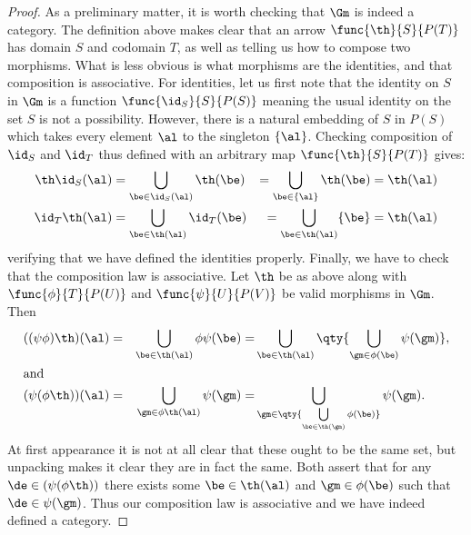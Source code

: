 \documentclass[../../main]{subfiles}
\begin{document}
\begin{proof}
	As a preliminary matter, it is worth checking that \(\Gm\) is indeed a
	category. The definition above makes clear that an arrow
	\(\func{\th}{S}{P(T)}\) has domain \(S\) and codomain \(T\), as well as
	telling us how to compose two morphisms. What is less obvious is what
	morphisms are the identities, and that composition is associative. For
	identities, let us first note that the identity on \(S\) in \(\Gm\) is a
	function \(\func{\id_S}{S}{P(S)}\) meaning the usual identity on the set
	\(S\) is not a possibility. However, there is a natural embedding of \(S\)
	in \(P(S)\) which takes every element \(\al\) to the singleton \(\{\al\}\).
	Checking composition of \(\id_S\) and \(\id_T\) thus defined with an
	arbitrary map \(\func{\th}{S}{P(T)}\) gives:
	\begin{alignat*}{4}
		\th\id_S(\al)&=
		\bigcup_{\be\in\id_S(\al)}\th(\be)&=
		\bigcup_{\be\in\{\al\}}\th(\be)&=
		\th(\al) \\
		\id_T\th(\al)&=
		\bigcup_{\be\in\th(\al)}\id_T(\be)&=
		\bigcup_{\be\in\th(\al)}\{\be\}&=
		\th(\al)
	\end{alignat*} verifying that we have defined the identities properly.
	Finally, we have to check that the composition law is associative. Let
	\(\th\) be as above along with \(\func{\phi}{T}{P(U)}\) and
	\(\func{\psi}{U}{P(V)}\) be valid morphisms in \(\Gm\). Then
	\begin{alignat*}{3}
		((\psi\phi)\th)(\al)=&&
		\bigcup_{\be\in\th(\al)}\phi\psi(\be)=&
		\bigcup_{\be\in\th(\al)}\qty{\bigcup_{\gm\in\phi(\be)}\psi(\gm)},\\
		\intertext{and}
		(\psi(\phi\th))(\al)=&&
		\bigcup_{\gm\in\phi\th(\al)}\psi(\gm)=&
		\bigcup_{\gm\in\qty{\bigcup\limits_{\be\in\th(\gm)}\phi(\be)}}\psi(\gm).
	\end{alignat*}
	At first appearance it is not at all clear that these ought to be the same
	set, but unpacking makes it clear they are in fact the same. Both assert
	that for any \(\de\in(\psi(\phi\th))\) there exists some \(\be\in\th(\al)\)
	and \(\gm\in\phi(\be)\) such that \(\de\in\psi(\gm)\). Thus our composition
	law is associative and we have indeed defined a category.


\end{proof}
\end{document}
